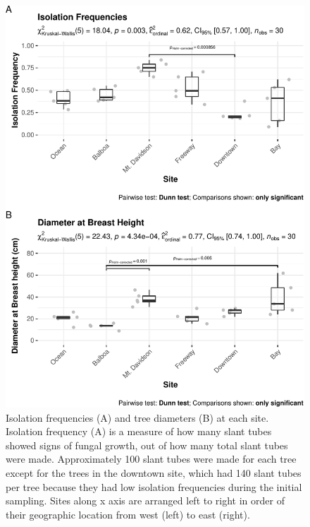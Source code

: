 \documentclass[fleqn,10pt,lineno]{wlpeerj} %
\begin{document}
\begin{figure}
\centering
\includegraphics{gibson2021_files/figure-latex/isolation-dbh-freq-plots-1.pdf}
\caption{\label{fig:isolation-dbh-freq-plots}Isolation frequencies (A) and tree diameters (B) at each site. Isolation frequency (A) is a measure of how many slant tubes showed signs of fungal growth, out of how many total slant tubes were made. Approximately 100 slant tubes were made for each tree except for the trees in the downtown site, which had 140 slant tubes per tree because they had low isolation frequencies during the initial sampling. Sites along x axis are arranged left to right in order of their geographic location from west (left) to east (right).}
\end{figure}
\end{document}
